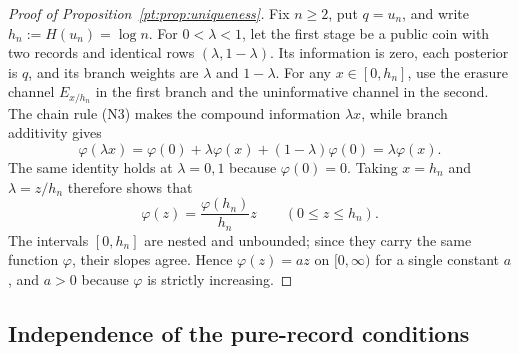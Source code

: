 \documentclass[11pt,a4paper]{article}
\theoremstyle{definition}
\newcommand{\Sh}{H}
\newcommand{\1}{\mathbf 1}
\begin{document}
\begin{proof}[Proof of Proposition~\ref{pt:prop:uniqueness}]
Fix $n\ge2$, put $q=u_n$, and write $h_n:=\Sh(u_n)=\log n$.  For $0<\lambda<1$, let the first stage be a public coin
with two records and identical rows $(\lambda,1-\lambda)$.  Its information is zero, each posterior is $q$, and its
branch weights are $\lambda$ and $1-\lambda$.  For any $x\in[0,h_n]$, use the erasure channel $E_{x/h_n}$ in the first
branch and the uninformative channel in the second.  The chain rule (N3) makes the compound information $\lambda x$,
while branch additivity gives
\[
\varphi(\lambda x)
=\varphi(0)+\lambda\varphi(x)+(1-\lambda)\varphi(0)
=\lambda\varphi(x).
\]
The same identity holds at $\lambda=0,1$ because $\varphi(0)=0$.  Taking $x=h_n$ and $\lambda=z/h_n$ therefore shows
that
\[
\varphi(z)=\frac{\varphi(h_n)}{h_n}z
\qquad(0\le z\le h_n).
\]
The intervals $[0,h_n]$ are nested and unbounded; since they carry the same function $\varphi$, their slopes agree.
Hence $\varphi(z)=az$ on $[0,\infty)$ for a single constant $a$, and $a>0$ because $\varphi$ is strictly increasing.
\end{proof}

\subsection{Independence of the pure-record conditions}
\end{document}
